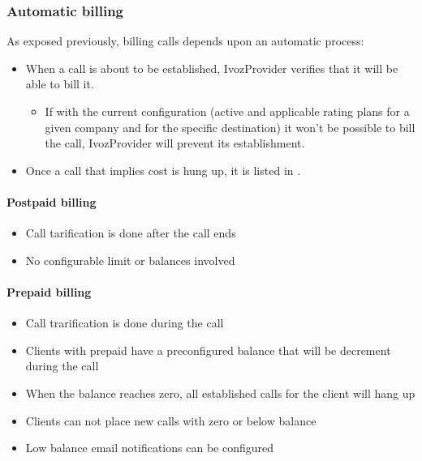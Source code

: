 \documentclass[letterpaper,10pt,english]{sphinxmanual}
\begin{document}
\subsubsection{Automatic billing}
\label{brand/billing/bill_a_call:automatic-billing}
As exposed previously, billing calls depends upon an automatic process:
\begin{itemize}
\item {} 
When a call is about to be established, IvozProvider verifies that it will be
able to bill it.
\begin{itemize}
\item {} 
If with the current configuration (active and applicable rating plans for
a given company and for the specific destination) it won't be possible to
bill the call, IvozProvider will prevent its establishment.

\end{itemize}

\item {} 
Once a call that implies cost is hung up, it is listed in {\hyperref[brand/billing/billable_calls:billable\string-calls]{}}.

\end{itemize}


\paragraph{Postpaid billing}
\label{brand/billing/bill_a_call:postpaid-billing}\begin{itemize}
\item {} 
Call tarification is done after the call ends

\item {} 
No configurable limit or balances involved

\end{itemize}


\paragraph{Prepaid billing}
\label{brand/billing/bill_a_call:prepaid-billing}\begin{itemize}
\item {} 
Call trarification is done during the call

\item {} 
Clients with prepaid have a preconfigured balance that will be decrement during the call

\item {} 
When the balance reaches zero, all established calls for the client will hang up

\item {} 
Clients can not place new calls with zero or below balance

\item {} 
Low balance email notifications can be configured

\end{itemize}
\end{document}
